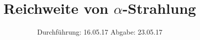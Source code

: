 

\subject{V701}
\title{Reichweite von \texorpdfstring{$\alpha$}{math}-Strahlung}
\date{
  Durchführung: 16.05.17
  \hspace{3em}
  Abgabe: 23.05.17
}



\maketitle
\thispagestyle{empty}
\tableofcontents
\newpage






\printbibliography


